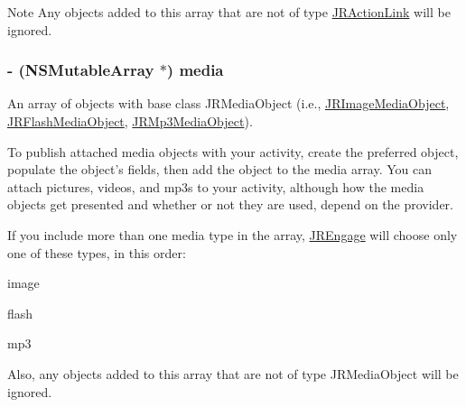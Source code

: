 \begin{DoxyNote}{Note}
Any objects added to this array that are not of type {\ttfamily \hyperlink{interface_j_r_action_link}{JRActionLink}} will be ignored. 
\end{DoxyNote}
\hypertarget{interface_j_r_activity_object_a2e4ff78f83d0f353f8e0c17ed48ce0ab}{
\subsubsection[{media}]{\setlength{\rightskip}{0pt plus 5cm}-\/ (NSMutableArray $\ast$) media}}
\label{interface_j_r_activity_object_a2e4ff78f83d0f353f8e0c17ed48ce0ab}
An array of objects with base class {\ttfamily JRMediaObject} (i.e., \hyperlink{interface_j_r_image_media_object}{JRImageMediaObject}, \hyperlink{interface_j_r_flash_media_object}{JRFlashMediaObject}, \hyperlink{interface_j_r_mp3_media_object}{JRMp3MediaObject}).

To publish attached media objects with your activity, create the preferred object, populate the object's fields, then add the object to the {\ttfamily media} array. You can attach pictures, videos, and mp3s to your activity, although how the media objects get presented and whether or not they are used, depend on the provider.

If you include more than one media type in the array, \hyperlink{class_j_r_engage}{JREngage} will choose only one of these types, in this order:
\begin{DoxyEnumerate}
\item image
\item flash
\item mp3
\end{DoxyEnumerate}

Also, any objects added to this array that are not of type {\ttfamily JRMediaObject} will be ignored.

